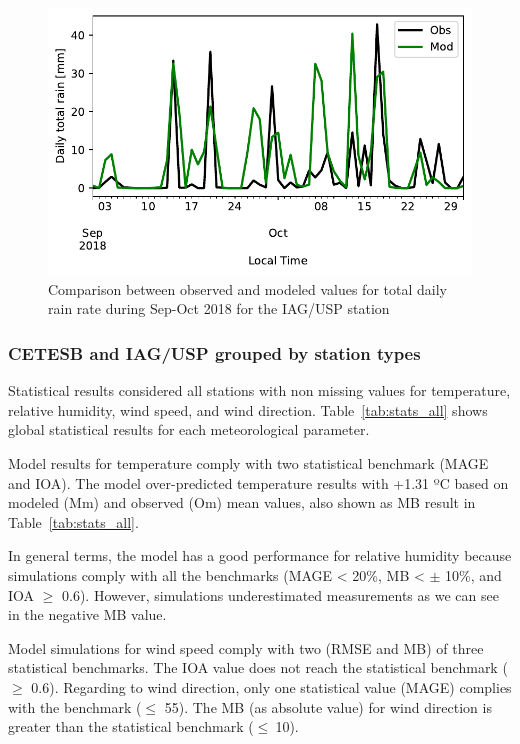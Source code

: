 \begin{figure}[!hbt]
	\centering
  \includegraphics[width=.8\textwidth]{fig/iag_daily_rain}
  \caption{Comparison between observed and modeled values for total daily rain rate during Sep-Oct 2018 for the IAG/USP station}
  \label{fig:iag_daily_rain}
\end{figure}




\subsubsection{CETESB and IAG/USP grouped by station types}
Statistical results considered all stations with non missing values for temperature, relative humidity, wind speed, and wind direction.
Table~\ref{tab:stats_all} shows global statistical results for each meteorological parameter.



Model results for temperature comply with two statistical benchmark (MAGE and IOA).
The model over-predicted temperature results with +1.31 ºC based on modeled (Mm) and observed (Om) mean values, also shown as MB result in Table~\ref{tab:stats_all}.

In general terms, the model has a good performance for relative humidity because simulations comply with all the benchmarks (MAGE < 20\%, MB < $\pm$ 10\%, and IOA $\geq$ 0.6).
However, simulations underestimated measurements as we can see in the negative MB value.

Model simulations for wind speed comply with two (RMSE and MB) of three statistical benchmarks.
The IOA value does not reach the statistical benchmark ($\geq$ 0.6).
Regarding to wind direction, only one statistical value (MAGE) complies with the benchmark ($\leq$ 55).
The MB (as absolute value) for wind direction is greater than the statistical benchmark ($\leq~$10).

